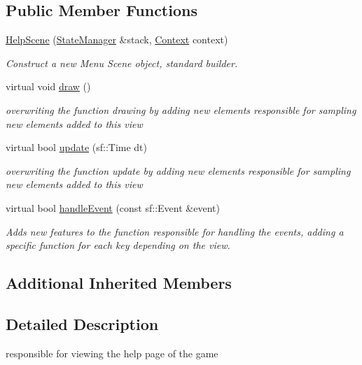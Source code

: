 \subsection*{Public Member Functions}
\begin{DoxyCompactItemize}
\item 
\hyperlink{classHelpScene_a97b066a6f6341021d0bc07a548ec3f6c}{Help\+Scene} (\hyperlink{classStateManager}{State\+Manager} \&stack, \hyperlink{structState_1_1Context}{Context} context)
\begin{DoxyCompactList}\small\item\em Construct a new Menu Scene object, standard builder. \end{DoxyCompactList}\item 
\mbox{\label{classHelpScene_a1c343c3ede7bb3d3a6cb4f0d0eba3e53}} 
virtual void \hyperlink{classHelpScene_a1c343c3ede7bb3d3a6cb4f0d0eba3e53}{draw} ()
\begin{DoxyCompactList}\small\item\em overwriting the function drawing by adding new elements responsible for sampling new elements added to this view \end{DoxyCompactList}\item 
virtual bool \hyperlink{classHelpScene_a2eb8b8e49f206b65291a8972f3c596c0}{update} (sf\+::\+Time dt)
\begin{DoxyCompactList}\small\item\em overwriting the function update by adding new elements responsible for sampling new elements added to this view \end{DoxyCompactList}\item 
virtual bool \hyperlink{classHelpScene_adebdd5586b2e0c618134d5bfc38f821b}{handle\+Event} (const sf\+::\+Event \&event)
\begin{DoxyCompactList}\small\item\em Adds new features to the function responsible for handling the events, adding a specific function for each key depending on the view. \end{DoxyCompactList}\end{DoxyCompactItemize}
\subsection*{Additional Inherited Members}


\subsection{Detailed Description}
responsible for viewing the help page of the game 


